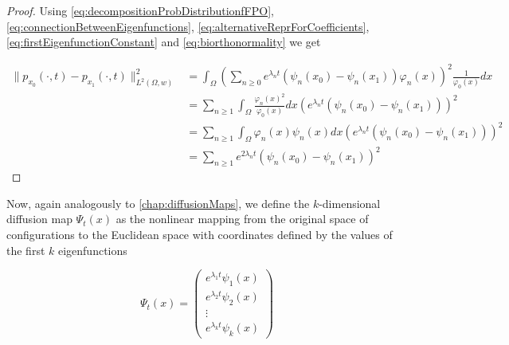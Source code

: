 \begin{proof}
Using \eqref{eq:decompositionProbDistributionfFPO}, \eqref{eq:connectionBetweenEigenfunctions}, \eqref{eq:alternativeReprForCoefficients}, \eqref{eq:firstEigenfunctionConstant} and \eqref{eq:biorthonormality} we get

\begin{equation*}\begin{aligned}
\|p_{x_0}(\cdot, t) - p_{x_1}(\cdot, t) \|_{L^2(\Omega, w)}^2 &=
\int_\Omega \left( \sum_{n\geq 0} e^{\lambda_n t}(\psi_n(x_0)-\psi_n(x_1)) \varphi_n(x)\right)^2\frac{1}{\varphi_0(x)}dx\\
&= \sum_{n\geq 1} \int_\Omega \frac{\varphi_n(x)^2}{\varphi_0(x)}dx \left(e^{\lambda_n t}(\psi_n(x_0)-\psi_n(x_1))\right)^2\\
&= \sum_{n\geq 1} \int_\Omega \varphi_n(x)\psi_n(x)dx \left(e^{\lambda_n t}(\psi_n(x_0)-\psi_n(x_1))\right)^2\\
&= \sum_{n\geq 1} e^{2 \lambda_n t}(\psi_n(x_0)-\psi_n(x_1))^2
\end{aligned}\end{equation*}
\end{proof}

Now, again analogously to \autoref{chap:diffusionMaps}, we define the $k$-dimensional diffusion map $\Psi_t(x)$ as the nonlinear mapping from the original space of configurations to the Euclidean space with coordinates defined by the values of the first $k$ eigenfunctions

\begin{definition}

\begin{equation*}
\Psi_t(x)=\begin{pmatrix}
  e^{\lambda_1 t}\psi_1(x) \\
  e^{\lambda_2 t}\psi_2(x) \\
  \vdots \\
  e^{\lambda_k t}\psi_k(x)
 \end{pmatrix}
\end{equation*}

\end{definition}











